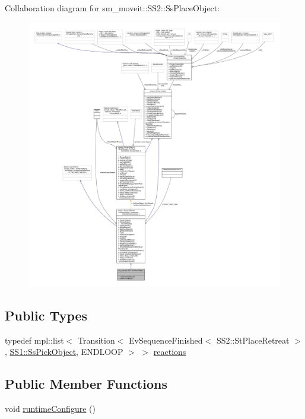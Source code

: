 Collaboration diagram for sm\+\_\+moveit\+:\+:S\+S2\+:\+:Ss\+Place\+Object\+:
\nopagebreak
\begin{figure}[H]
\begin{center}
\leavevmode
\includegraphics[width=350pt]{structsm__moveit_1_1SS2_1_1SsPlaceObject__coll__graph}
\end{center}
\end{figure}
\subsection*{Public Types}
\begin{DoxyCompactItemize}
\item 
typedef mpl\+::list$<$ Transition$<$ Ev\+Sequence\+Finished$<$ S\+S2\+::\+St\+Place\+Retreat $>$, \hyperlink{structsm__moveit_1_1SS1_1_1SsPickObject}{S\+S1\+::\+Ss\+Pick\+Object}, E\+N\+D\+L\+O\+OP $>$ $>$ \hyperlink{structsm__moveit_1_1SS2_1_1SsPlaceObject_aca741dbdbd329a6f6bc8327f16c45c8c}{reactions}
\end{DoxyCompactItemize}
\subsection*{Public Member Functions}
\begin{DoxyCompactItemize}
\item 
void \hyperlink{structsm__moveit_1_1SS2_1_1SsPlaceObject_a3bd09ee480b0444c5df6aee4b4f16ca2}{runtime\+Configure} ()
\end{DoxyCompactItemize}
